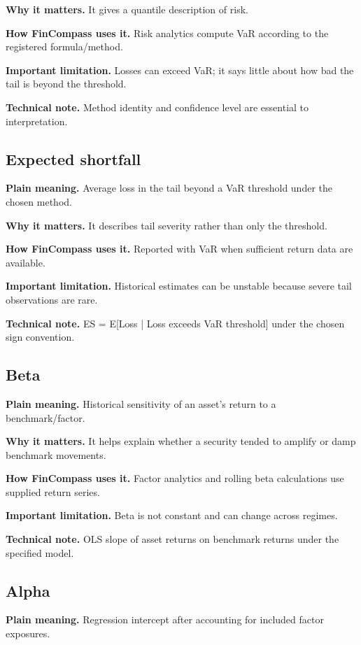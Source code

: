 \documentclass[11pt]{article}
\begin{document}
\textbf{Why it matters.} It gives a quantile description of risk.

\textbf{How FinCompass uses it.} Risk analytics compute VaR according to the registered formula/method.

\textbf{Important limitation.} Losses can exceed VaR; it says little about how bad the tail is beyond the threshold.

\textbf{Technical note.} Method identity and confidence level are essential to interpretation.

\subsection{Expected shortfall}
\textbf{Plain meaning.} Average loss in the tail beyond a VaR threshold under the chosen method.

\textbf{Why it matters.} It describes tail severity rather than only the threshold.

\textbf{How FinCompass uses it.} Reported with VaR when sufficient return data are available.

\textbf{Important limitation.} Historical estimates can be unstable because severe tail observations are rare.

\textbf{Technical note.} ES = E[Loss | Loss exceeds VaR threshold] under the chosen sign convention.

\subsection{Beta}
\textbf{Plain meaning.} Historical sensitivity of an asset’s return to a benchmark/factor.

\textbf{Why it matters.} It helps explain whether a security tended to amplify or damp benchmark movements.

\textbf{How FinCompass uses it.} Factor analytics and rolling beta calculations use supplied return series.

\textbf{Important limitation.} Beta is not constant and can change across regimes.

\textbf{Technical note.} OLS slope of asset returns on benchmark returns under the specified model.

\subsection{Alpha}
\textbf{Plain meaning.} Regression intercept after accounting for included factor exposures.
\end{document}
